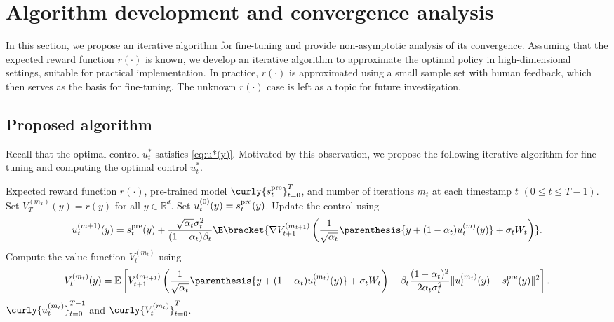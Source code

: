 \documentclass{article}
\newcommand{\R}{\mathbb{R}}
\begin{document}
\section{Algorithm development and convergence analysis}
\label{sec:algorithm}
In this section, we propose an iterative algorithm for fine-tuning and provide non-asymptotic analysis of its  convergence. Assuming that the expected reward function  $r(\cdot)$ is known, we develop an iterative algorithm to approximate the optimal policy in high-dimensional settings, suitable for practical implementation. In practice,  $r(\cdot)$ is  approximated using a small sample set with human feedback, which then serves as the basis for fine-tuning. The unknown  $r(\cdot)$ case is left as a topic for future investigation.



\subsection{Proposed algorithm}
Recall that the optimal control $u_t^*$ satisfies \eqref{eq:u*(y)}. Motivated by this observation, we propose the following iterative algorithm for fine-tuning and computing the optimal control $u_t^*$. 
\begin{algorithm}[H]
    \caption{Policy Iteration for Fine-Tuning (PI-FT)}
    \begin{algorithmic}[1] \label{algo:update-u}
     Expected reward function $r(\cdot)$, pre-trained model $\curly{s_t^{\rm pre}}_{t = 0}^{T} $, and number of iterations $m_t$ at each timestamp $t$ $(0\leq t \leq T-1)$.
    \STATE Set $V_T^{(m_T)}(y) = r(y)$ for all $y \in \R^d$. 
    \STATE Set $u_{t}^{(0)}(y) = s_t^{\rm pre}(y)$.
    \STATE  Update the control using
    \begin{align}
        u_{t}^{(m+1)}(y) = s_{t}^{\rm pre}(y) + \frac{\sqrt{\alpha_{t}}\sigma_{t}^{2}}{(1 - \alpha_{t})\beta_t}\E\bracket{\nabla {V}_{t+1}^{(m_{t+1})}\left(\frac{1}{\sqrt{\alpha_t}}\parenthesis{y + (1 - \alpha_t)u_t^{(m)}(y)} + \sigma_t W_t\right)}. \label{eq:update-u_t}
    \end{align}
    \ENDFOR 
    \STATE Compute the value function $V_t^{(m_t)}$ using 
    \begin{align}
        V_{t}^{(m_t)}(y) = \mathbb{E}\left[{V}^{(m_{t+1})}_{t+1}\left(\frac{1}{\sqrt{\alpha_t}}\parenthesis{y + (1 - \alpha_t)u_t^{(m_t)}(y)} + \sigma_t W_t\right) -\beta_t \frac{(1-\alpha_t)^2}{2\alpha_t \sigma_t^2}\|u_t^{(m_t)}(y)-s_t^{\rm pre}(y)\|^2\right]. \label{eq:eval-v_t}
    \end{align}
    \ENDFOR 
    \RETURN $ \curly{u_t^{(m_t)}}_{t = 0}^{T-1} $ and $ \curly{V_t^{(m_t)}}_{t = 0}^{T} $.
    \end{algorithmic}
\end{algorithm}
\end{document}
